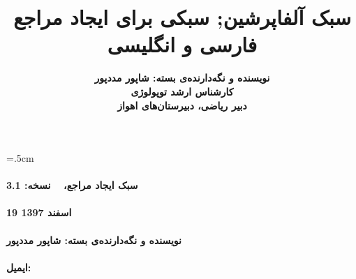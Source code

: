 \documentclass{article}
\title{\textbf{
	سبک آلفاپرشین; سبکی برای ایجاد مراجع فارسی و انگلیسی}}
\author{\LARGE{\textbf{نویسنده و نگه‌دارنده‌ی بسته‌: شاپور مددپور}}
\\[1cm]
\LARGE{\textbf{
کارشناس ارشد توپولوژی}}
\\[1cm]
\LARGE{\textbf{
دبیر ریاضی، دبیرستان‌های اهواز}}
}
\begin{document}
\maketitle
\clearpage
\baselineskip=1cm
\tableofcontents\clearpage
\baselineskip=.5cm
\paragraph{\color{red!50!black}سبک ایجاد مراجع، 
~  نسخه: 3.1}
\paragraph{\color{red!50!black}19 اسفند 1397}
\paragraph{\color{red!50!black}
نویسنده و نگه‌دارنده‌ی بسته‌: شاپور مددپور}
\paragraph{\color{red!50!black}
ایمیل:
}\hfill
\end{document}

